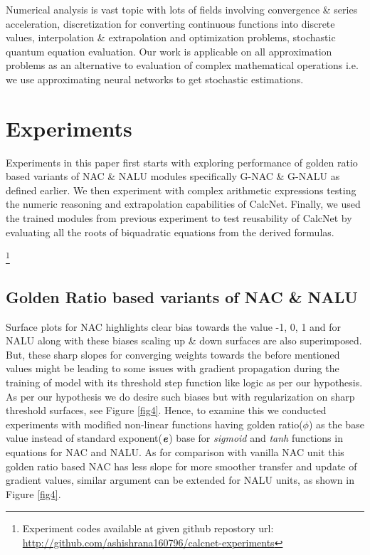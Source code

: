 \documentclass[conference]{IEEEtran}
\begin{document}
Numerical analysis is vast topic with lots of fields involving convergence \& series acceleration, discretization for converting continuous functions into discrete values, interpolation \& extrapolation and optimization problems, stochastic quantum equation evaluation. Our work is applicable on all approximation problems as an alternative to evaluation of complex mathematical operations i.e. we use approximating neural networks to get stochastic estimations.

\section{Experiments}

Experiments in this paper first starts with exploring performance of golden ratio based variants of NAC \& NALU modules specifically G-NAC \& G-NALU as defined earlier. We then experiment with complex arithmetic expressions testing the numeric reasoning and extrapolation capabilities of CalcNet. Finally, we used the trained modules from previous experiment to test reusability of CalcNet by evaluating all the roots of biquadratic equations from the derived formulas.

\footnote{ Experiment codes available at given github repostory url: \url{http://github.com/ashishrana160796/calcnet-experiments}}

\subsection{Golden Ratio based variants of NAC \& NALU}

Surface plots for NAC highlights clear bias towards the value -1, 0, 1 and for NALU along with these biases scaling up \& down surfaces are also superimposed. But, these sharp slopes for converging weights towards the before mentioned values might be leading to some issues with gradient propagation during the training of model with its threshold step function like logic as per our hypothesis. As per our hypothesis we do desire such biases but with regularization on sharp threshold surfaces, see Figure \ref{fig4}. Hence, to examine this we conducted experiments with modified non-linear functions having golden ratio($\phi$) as the base value instead of standard exponent($\textbf{\textit{e}}$) base for \textit{sigmoid} and \textit{tanh} functions in equations for NAC and NALU. As for comparison with vanilla NAC unit this golden ratio based NAC has less slope for more smoother transfer and update of gradient values, similar argument can be extended for NALU units, as shown in Figure \ref{fig4}.
\end{document}
